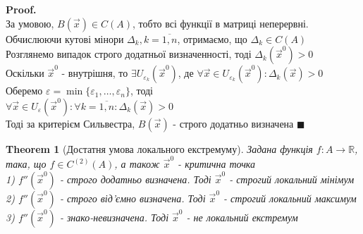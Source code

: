 \documentclass[a4paper, 14pt]{extarticle}
\theoremstyle{theoremdd}
\newtheorem{theorem}{Theorem}[subsection]
\theoremstyle{theoremdd}
\theoremstyle{theoremdd}
\theoremstyle{theoremdd}
\theoremstyle{theoremdd}
\theoremstyle{theoremdd}
\theoremstyle{theoremdd}
\newenvironment{pf}{\vspace*{-3mm} \textbf{Proof. \\}}{$\blacksquare$}
\begin{document}
\begin{pf}
За умовою, $B(\vec{x}) \in C(A)$, тобто всі функції в матриці неперервні. Обчислюючи кутові мінори $\Delta_k, k = \overline{1,n}$, отримаємо, що $\Delta_k \in C(A)$\\
Розглянемо випадок строго додатньої визначенності, тоді $\Delta_k (\vec{x}^0) > 0$\\
Оскільки $\vec{x}^0$ - внутрішня, то $\exists U_{\varepsilon_k}(\vec{x}^0)$, де $\forall \vec{x} \in U_{\varepsilon_k}(\vec{x}^0): \Delta_k(\vec{x}) > 0$\\
Оберемо $\varepsilon = \min \{\varepsilon_1, \dots, \varepsilon_n \}$, тоді\\
$\forall \vec{x} \in U_{\varepsilon}(\vec{x}^0): \forall k = \overline{1,n}: \Delta_k(\vec{x}) > 0$\\
Тоді за критерієм Сильвестра, $B(\vec{x})$ - строго додатньо визначена
\end{pf}

\begin{theorem}[Достатня умова локального екстремуму]
Задана функція $f: A \to \mathbb{R}$, така, що $f \in C^{(2)}(A)$, а також $\vec{x}^0$ - критична точка\\
1) $f''(\vec{x}^0)$ - строго додатньо визначена. Тоді $\vec{x}^0$ - строгий локальний мінімум\\
2) $f''(\vec{x}^0)$ - строго від'ємно визначена. Тоді $\vec{x}^0$ - строгий локальний максимум\\
3) $f''(\vec{x}^0)$ - знако-невизначена. Тоді $\vec{x}^0$ - не локальний екстремум
\end{theorem}
\end{document}
